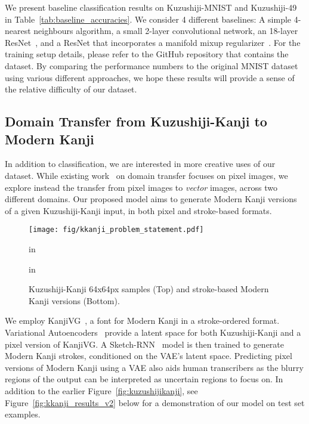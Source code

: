 \documentclass{article}
\begin{document}
\begin{CJK}{UTF8}{min}
We present baseline classification results on Kuzushiji-MNIST and Kuzushiji-49 in Table~\ref{tab:baseline_accuracies}. We consider 4 different baselines: A simple 4-nearest neighbours algorithm, a small 2-layer convolutional network, an 18-layer ResNet~\citep{he2016identity}, and a ResNet that incorporates a manifold mixup regularizer~\citep{verma2018manifold}. For the training setup details, please refer to the GitHub repository that contains the dataset. By comparing the performance numbers to the original MNIST dataset using various different approaches, we hope these results will provide a sense of the relative difficulty of our dataset.





\subsection{Domain Transfer from Kuzushiji-Kanji to Modern Kanji}
\label{sec:domaintransfer}

In addition to classification, we are interested in more creative uses of our dataset. While existing work~\cite{isola2017image,liu2017unsupervised,wolf2017unsupervised,bousmalis2017unsupervised} on domain transfer focuses on pixel images, we explore instead the transfer from pixel images to \textit{vector} images, across two different domains. Our proposed model aims to generate Modern Kanji versions of a given Kuzushiji-Kanji input, in both pixel and stroke-based formats.

\begin{figure}[!htb]
\vskip -0.05in
\begin{center}
\centerline{\texttt{[image: fig/kkanji\_problem\_statement.pdf]}}
 in
\caption{Kuzushiji-Kanji 64x64px samples (Top) and stroke-based Modern Kanji versions (Bottom).}
\label{fig:kkanji_problem_statement}
\end{center}
 in
\end{figure}

We employ KanjiVG~\cite{kanjivg}, a font for Modern Kanji in a stroke-ordered format. Variational Autoencoders~\cite{vae, vae_dm} provide a latent space for both Kuzushiji-Kanji and a pixel version of KanjiVG. A Sketch-RNN~\cite{ha2017neural} model is then trained to generate Modern Kanji strokes, conditioned on the VAE's latent space. Predicting pixel versions of Modern Kanji using a VAE also aids human transcribers as the blurry regions of the output can be interpreted as uncertain regions to focus on. In addition to the earlier Figure~\ref{fig:kuzushijikanji}, see Figure~\ref{fig:kkanji_results_v2} below for a demonstration of our model on test set examples.


\end{CJK}
\end{document}
